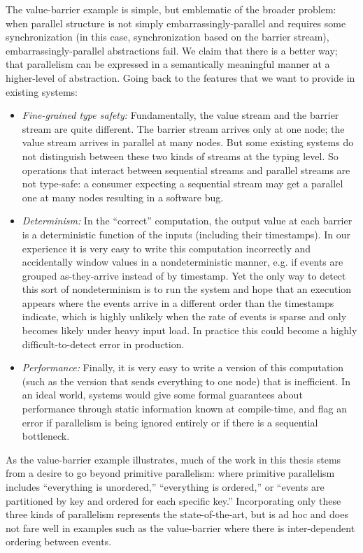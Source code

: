 The value-barrier example is simple, but emblematic of the broader problem: when parallel structure is not simply embarrassingly-parallel and requires some synchronization (in this case, synchronization based on the barrier stream), embarrassingly-parallel abstractions fail.
We claim that there is a better way; that parallelism can be expressed in a semantically meaningful manner at a higher-level of abstraction.
Going back to the features that we want to provide in existing systems:
\begin{itemize}
  \item \emph{Fine-grained type safety:} Fundamentally, the value stream and the barrier stream are quite different. The barrier stream arrives only at one node; the value stream arrives in parallel at many nodes. But some existing systems do not distinguish between these two kinds of streams at the typing level. So operations that interact between sequential streams and parallel streams are not type-safe: a consumer expecting a sequential stream may get a parallel one at many nodes resulting in a software bug.
  \item \emph{Determinism:} In the ``correct'' computation, the output value at each barrier is a deterministic function of the inputs (including their timestamps). In our experience it is very easy to write this computation incorrectly and accidentally window values in a nondeterministic manner, e.g. if events are grouped as-they-arrive instead of by timestamp. Yet the only way to detect this sort of nondeterminism is to run the system and hope that an execution appears where the events arrive in a different order than the timestamps indicate, which is highly unlikely when the rate of events is sparse and only becomes likely under heavy input load. In practice this could become a highly difficult-to-detect error in production.
  \item \emph{Performance:} Finally, it is very easy to write a version of this computation (such as the \naive{} version that sends everything to one node) that is inefficient. In an ideal world, systems would give some formal guarantees about performance through static information known at compile-time, and flag an error if parallelism is being ignored entirely or if there is a sequential bottleneck.
\end{itemize}

As the value-barrier example illustrates, much of the work in this thesis stems from a desire to go beyond primitive parallelism: where primitive parallelism includes ``everything is unordered,'' ``everything is ordered,'' or ``events are partitioned by key and ordered for each specific key.'' Incorporating only these three kinds of parallelism represents the state-of-the-art, but is ad hoc and does not fare well in examples such as the value-barrier where there is inter-dependent ordering between events.

